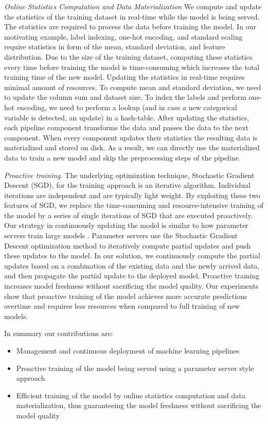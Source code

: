 \textit{Online Statistics Computation and Data Materialization}
We compute and update the statistics of the training dataset in real-time while the model is being served. 
The statistics are required to process the data before training the model.
In our motivating example, label indexing, one-hot encoding, 
and standard scaling require statistics in form of the mean, standard deviation, and feature distribution.
Due to the size of the training dataset, computing these statistics every time before training the model is time-consuming which increases the total training time of the new model.
Updating the statistics in real-time requires minimal amount of resources. 
To compute mean and standard deviation, we need to update the column sum and dataset size.
To index the labels and perform one-hot encoding, we need to perform a lookup (and in case a new categorical variable is detected, an update) in a hash-table. 
After updating the statistics, each pipeline component transforms the data and passes the data to the next component.
When every component updates their statistics the resulting data is materialized and stored on disk.
As a result, we can directly use the materialized data to train a new model and skip the preprocessing steps of the pipeline.

\textit{Proactive training.}
The underlying optimization technique, Stochastic Gradient Descent (SGD), for the training approach is an iterative algorithm.
Individual iterations are independent and are typically light weight.
By exploiting these two features of SGD, we replace the time-consuming and resource-intensive training of the model by a series of single iterations of SGD that are executed proactively.
Our strategy in continuously updating the model is similar to how parameter servers train large models \cite{li2014scaling}.
Parameter servers use the Stochastic Gradient Descent optimization method to iteratively compute partial updates and push these updates to the model.
In our solution, we continuously compute the partial updates based on a combination of the existing data and the newly arrived data, and then propagate the partial update to the deployed model.
Proactive training increases model freshness without sacrificing the model quality.
Our experiments show that proactive training of the model achieves more accurate predictions overtime and requires less resources when compared to full training of new models.

In summary our contributions are:
\begin{itemize}
\item Management and continuous deployment of machine learning pipelines
\item Proactive training of the model being served using a parameter server style approach
\item Efficient training of the model by online statistics computation and data materialization, thus guaranteeing the model freshness without sacrificing the model quality
\end{itemize}

